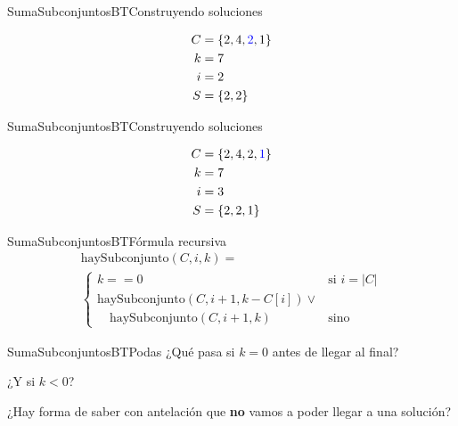 \documentclass{beamer}
\begin{document}
\begin{frame}{SumaSubconjuntosBT}{Construyendo soluciones}

    {\Huge 
    \begin{align*}
        C &= \{2,4,\mathcolor{blue}{2},1\}\\
        k &= 7\\
        i &= 2\\
        S &= \{2, 2\}
    \end{align*}
    }
\end{frame}

\begin{frame}{SumaSubconjuntosBT}{Construyendo soluciones}

    {\Huge 
    \begin{align*}
        C &= \{2,4,2,\mathcolor{blue}{1}\}\\
        k &= 7\\
        i &= 3\\
        S &= \{2, 2, 1\}
    \end{align*}
    }
\end{frame}

\begin{frame}{SumaSubconjuntosBT}{Fórmula recursiva}
    \begin{multline*}
        \text{haySubconjunto}(C, i, k) = \\\begin{cases}
            k == 0 & \text{si } i = |C|\\
            \text{haySubconjunto}(C, i+1, k - C[i]) \lor \\\quad\text{haySubconjunto}(C, i+1, k)  & \text{sino}
        \end{cases}   
    \end{multline*}
\end{frame}

\begin{frame}{SumaSubconjuntosBT}{Podas}
    ¿Qué pasa si $k = 0$ antes de llegar al final?
    \vspace{1em}

     ¿Y si $k < 0$?
    \vspace{1em}

     ¿Hay forma de saber con antelación que \textbf{no} vamos a poder llegar a una solución?
\end{frame}
\end{document}
